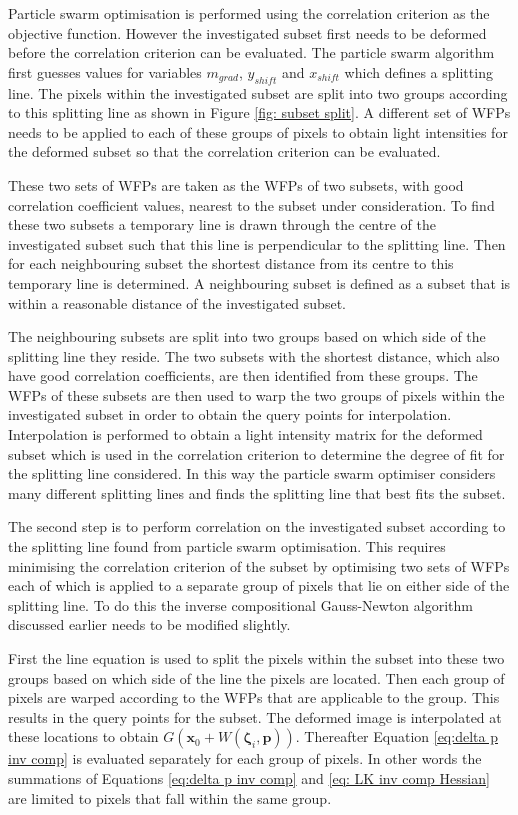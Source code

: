 \documentclass[12pt,oneside,openany,a4paper, %
english, %
masters-t, goldenblock]{usthesis}
\begin{document}
Particle swarm optimisation is performed using the correlation criterion as the objective function. However the investigated subset first needs to be deformed before the correlation criterion can be evaluated. The particle swarm algorithm first guesses values for variables $m_{grad}$, $y_{shift}$ and $x_{shift}$ which defines a splitting line. The pixels within the investigated subset are split into two groups according to this splitting line as shown in Figure \ref{fig: subset split}. A different set of WFPs needs to be applied to each of these groups of pixels to obtain light intensities for the deformed subset so that the correlation criterion can be evaluated.

These two sets of WFPs are taken as the WFPs of two subsets, with good correlation coefficient values, nearest to the subset under consideration. To find these two subsets a temporary line is drawn through the centre of the investigated subset such that this line is perpendicular to the splitting line. Then for each neighbouring subset the shortest distance from its centre to this temporary line is determined. A neighbouring subset is defined as a subset that is within a reasonable distance of the investigated subset.

The neighbouring subsets are split into two groups based on which side of the splitting line they reside. The two subsets with the shortest distance, which also have good correlation coefficients, are then identified from these groups. The WFPs of these subsets are then used to warp the two groups of pixels within the investigated subset in order to obtain the query points for interpolation. Interpolation is performed to obtain a light intensity matrix for the deformed subset which is used in the correlation criterion to determine the degree of fit for the splitting line considered. In this way the particle swarm optimiser considers many different splitting lines and finds the splitting line that best fits the subset.

The second step is to perform correlation on the investigated subset according to the splitting line found from particle swarm optimisation. This requires minimising the correlation criterion of the subset by optimising two sets of WFPs each of which is applied to a separate group of pixels that lie on either side of the splitting line. To do this the inverse compositional Gauss-Newton algorithm discussed earlier needs to be modified slightly.

First the line equation is used to split the pixels within the subset into these two groups based on which side of the line the pixels are located. Then each group of pixels are warped according to the WFPs that are applicable to the group. This results in the query points for the subset. The deformed image is interpolated at these locations to obtain $G(\bm{x}_0+W(\bm{\zeta}_i,\bm{p}))$. Thereafter Equation \ref{eq:delta p inv comp} is evaluated separately for each group of pixels. In other words the summations of Equations \ref{eq:delta p inv comp} and \ref{eq: LK inv comp Hessian} are limited to pixels that fall within the same group. 
\end{document}
